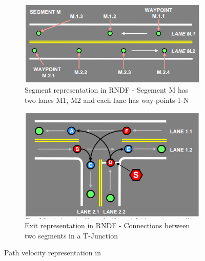 


\begin{figure}
	\centering
	\begin{subfigure}{.56\textwidth}
	    \centering
		\includegraphics[width=1.0\textwidth]{Images/rndf_segment.png}
		\caption{Segment representation in RNDF - Segement M has two lanes M1, M2 and each lane has way points 1-N}
		\label{rndf_segment}
	\end{subfigure}%
	\begin{subfigure}{.44\textwidth}
		\centering
		\includegraphics[width=1.0\textwidth]{Images/rndf_exits.png}
		\caption{Exit representation in RNDF - Connections between two segments in a T-Junction}
		\label{rndf_exits}
	\end{subfigure}
	\caption{Path velocity representation in \cite{traj_planner_optimization}}
	\label{rndf_seg_exit}
\end{figure}

